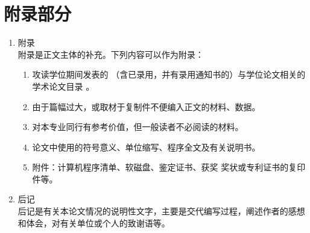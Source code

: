 \section{附录部分}
\begin{enumerate}
    \item 附录\\
        附录是正文主体的补充。下列内容可以作为附录：
        \begin{enumerate}
            \item 攻读学位期间发表的 （含已录用，并有录用通知书的）与学位论文相关的学术论文目录 。
            \item 由于篇幅过大，或取材于复制件不便编入正文的材料、数据。
            \item 对本专业同行有参考价值，但一般读者不必阅读的材料。
            \item 论文中使用的符号意义、单位缩写、程序全文及有关说明书。
            \item 附件：计算机程序清单、软磁盘、鉴定证书、获奖 奖状或专利证书的复印件等。
        \end{enumerate}
    \item 后记\\
        后记是有关本论文情况的说明性文字，主要是交代编写过程，阐述作者的感想和体会，对有关单位或个人的致谢语等。
\end{enumerate} 


\cleardoublepage
